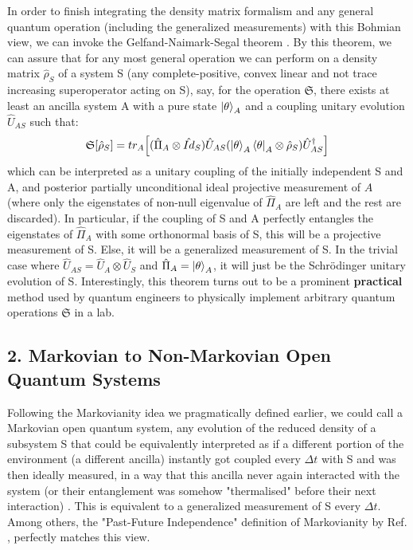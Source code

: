 \documentclass[11pt, a4paper]{article} %
\begin{document}
In order to finish integrating the density matrix formalism and any general quantum operation (including the generalized measurements) with this Bohmian view, we can invoke the Gelfand-Naimark-Segal theorem \cite{GNSTheorem, Generalized}. By this theorem, we can assure that for any most general operation we can perform on a density matrix $\hat{\rho}_S$ of a system S (any complete-positive, convex linear and not trace increasing superoperator acting on S), say, for the operation $\mathfrak{S}$, there exists at least an ancilla system A with a pure state $\ket{\theta}_A$ and a coupling unitary evolution $\hat{U}_{AS}$ such that:
\begin{equation}
\mathfrak{S}[\hat{\rho}_S]=tr_A\qty[ (\hat{\Pi}_A\otimes \hat{Id}_S)  \hat{U}_{AS}\qty(\ket{\theta}_A\bra{\theta}_A\otimes \hat{\rho}_S)\hat{U}_{AS}^\dagger]
\end{equation}
which can be interpreted as a unitary coupling of the initially independent S and A, and posterior partially unconditional ideal projective measurement of $A$ (where only the eigenstates of non-null eigenvalue of $\hat{\Pi}_A$ are left and the rest are discarded). In particular, if the coupling of S and A perfectly entangles the eigenstates of $\hat{\Pi}_A$ with some orthonormal basis of S, this will be a projective measurement of S. Else, it will be a generalized measurement of S. In the trivial case where $\hat{U}_{AS}=\hat{U}_A\otimes\hat{U}_S$ and $\hat{\Pi}_A=\ket{\theta}_A$, it will just be the Schrödinger unitary evolution of S. Interestingly, this theorem turns out to be a prominent {\bf practical} method used by quantum engineers to physically implement arbitrary quantum operations $\mathfrak{S}$ in a lab.


\subsection*{2. Markovian to Non-Markovian Open Quantum Systems}
Following the Markovianity idea we pragmatically defined earlier, we could call a Markovian open quantum system, any evolution of the reduced density of a subsystem S that could be equivalently interpreted as if a different portion of the environment (a different ancilla) instantly got coupled every $\Delta t$ with S and was then ideally measured, in a way that this ancilla never again interacted with the system (or their entanglement was somehow "thermalised" before their next interaction) \cite{QuantumTrajs}. This is equivalent to a generalized measurement of S every $\Delta t$. Among others, the "Past-Future Independence" definition of Markovianity by Ref. \cite{MarkovianityDefs}, perfectly matches this view.
\end{document}
